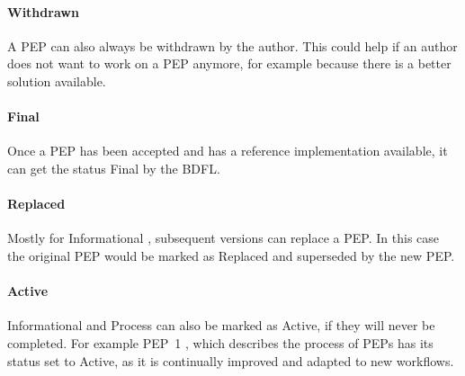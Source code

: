 \paragraph{Withdrawn}

A \ac{PEP} can also always be withdrawn by the author. This could help if an
author does not want to work on a \ac{PEP} anymore, for example because there
is a better solution available.

\paragraph{Final}

Once a \ac{PEP} has been accepted and has a reference implementation available,
it can get the status Final by the \ac{BDFL}.

\paragraph{Replaced}

Mostly for Informational , subsequent versions can replace a
\ac{PEP}. In this case the original \ac{PEP} would be marked as Replaced and
superseded by the new \ac{PEP}.

\paragraph{Active}

Informational and Process  can also be marked as Active, if they will never
be completed. For example \ac{PEP}~1 \cite{Warsaw2000}, which describes the
process of \acp{PEP} has its status set to Active, as it is continually
improved and adapted to new workflows.

